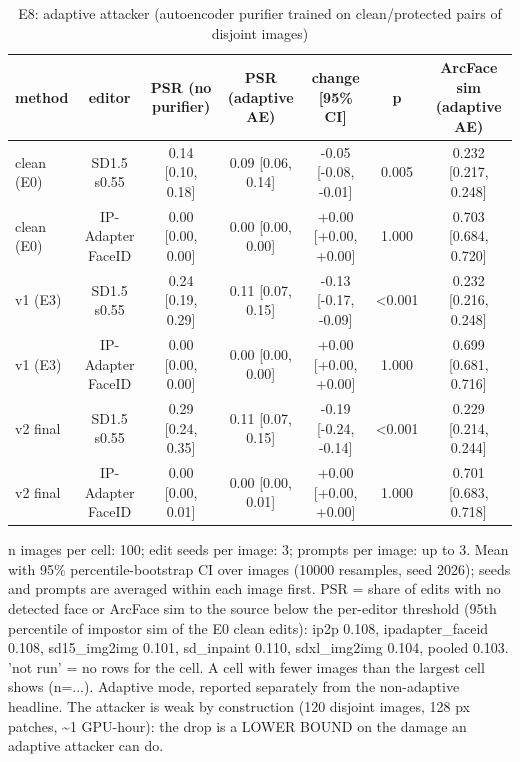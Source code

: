 \begin{table}[t]
\centering
\small
\begin{tabular}{lcccccc}
\toprule
method & editor & PSR (no purifier) & PSR (adaptive AE) & change [95\% CI] & p & ArcFace sim (adaptive AE) \\
\midrule
clean (E0) & SD1.5 s0.55 & 0.14 [0.10, 0.18] & 0.09 [0.06, 0.14] & -0.05 [-0.08, -0.01] & 0.005 & 0.232 [0.217, 0.248] \\
clean (E0) & IP-Adapter FaceID & 0.00 [0.00, 0.00] & 0.00 [0.00, 0.00] & +0.00 [+0.00, +0.00] & 1.000 & 0.703 [0.684, 0.720] \\
v1 (E3) & SD1.5 s0.55 & 0.24 [0.19, 0.29] & 0.11 [0.07, 0.15] & -0.13 [-0.17, -0.09] & <0.001 & 0.232 [0.216, 0.248] \\
v1 (E3) & IP-Adapter FaceID & 0.00 [0.00, 0.00] & 0.00 [0.00, 0.00] & +0.00 [+0.00, +0.00] & 1.000 & 0.699 [0.681, 0.716] \\
v2 final & SD1.5 s0.55 & 0.29 [0.24, 0.35] & 0.11 [0.07, 0.15] & -0.19 [-0.24, -0.14] & <0.001 & 0.229 [0.214, 0.244] \\
v2 final & IP-Adapter FaceID & 0.00 [0.00, 0.01] & 0.00 [0.00, 0.01] & +0.00 [+0.00, +0.00] & 1.000 & 0.701 [0.683, 0.718] \\
\bottomrule
\end{tabular}
\caption{E8: adaptive attacker (autoencoder purifier trained on clean/protected pairs of disjoint images)}
\label{tab:e8}
\par\footnotesize n images per cell: 100; edit seeds per image: 3; prompts per image: up to 3. Mean with 95\% percentile-bootstrap CI over images (10000 resamples, seed 2026); seeds and prompts are averaged within each image first. PSR = share of edits with no detected face or ArcFace sim to the source below the per-editor threshold (95th percentile of impostor sim of the E0 clean edits): ip2p 0.108, ipadapter\_faceid 0.108, sd15\_img2img 0.101, sd\_inpaint 0.110, sdxl\_img2img 0.104, pooled 0.103. 'not run' = no rows for the cell. A cell with fewer images than the largest cell shows (n=...). Adaptive mode, reported separately from the non-adaptive headline. The attacker is weak by construction (120 disjoint images, 128 px patches, \textasciitilde{}1 GPU-hour): the drop is a LOWER BOUND on the damage an adaptive attacker can do.
\end{table}
